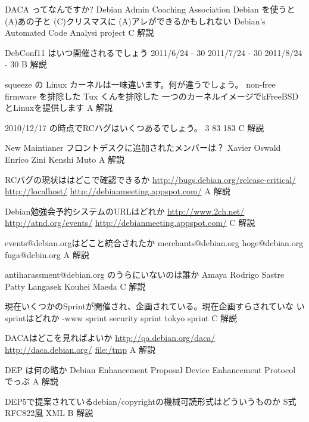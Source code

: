 %

\santaku
{DACA ってなんですか?}
{Debian Admin Coaching Association}
{Debian を使うと (A)あの子と (C)クリスマスに (A)アレができるかもしれない}
{Debian's Automated Code Analysi project}
{C}
{解説}

\santaku
{DebConf11 はいつ開催されるでしょう}
{2011/6/24 - 30}
{2011/7/24 - 30}
{2011/8/24 - 30}
{B}
{解説}

\santaku
{squeeze の Linux カーネルは一味違います。何が違うでしょう。}
{non-free firmware を排除した}
{Tux くんを排除した}
{一つのカーネルイメージでkFreeBSDとLinuxを提供します}
{A}
{解説}

\santaku
{2010/12/17 の時点でRCハグはいくつあるでしょう。}
{3} 
{83}
{183}
{C}
{解説}

\santaku
{New Maintianer フロントデスクに追加されたメンバーは？}
{Xavier Oswald}
{Enrico Zini}
{Kenshi Muto}
{A}
{解説}

\santaku
{RCバグの現状ははどこで確認できるか}
{\url{http://bugs.debian.org/release-critical/}}
{\url{http://localhost/}}
{\url{http://debianmeeting.appspot.com/}}
{A}
{解説}

\santaku
{Debian勉強会予約システムのURLはどれか}
{\url{http://www.2ch.net/}}
{\url{http://atnd.org/events/}}
{\url{http://debianmeeting.appspot.com/}}
{C}
{解説}

\santaku
{events@debian.orgはどこと統合されたか}
{merchants@debian.org}
{hoge@debian.org}
{fuga@debin.org}
{A}
{解説}

\santaku
{antiharassment@debian.org のうらにいないのは誰か}
{Amaya Rodrigo Sastre}
{Patty Langasek}
{Kouhei Maeda}
{C}
{解説}

\santaku
{現在いくつかのSprintが開催され、企画されている。現在企画すらされていな
いsprintはどれか}
{-www sprint}
{security sprint}
{tokyo sprint}
{C}
{解説}

\santaku
{DACAはどこを見ればよいか}
{\url{http://qa.debian.org/daca/}}
{\url{http://daca.debian.org/}}
{\url{file:/tmp}}
{A}
{解説}

\santaku
{DEP は何の略か}
{Debian Enhancement Proposal}
{Device Enhancement Protocol}
{でっぷ}
{A}
{解説}

\santaku
{DEP5で提案されているdebian/copyrightの機械可読形式はどういうものか}
{S式}
{RFC822風}
{XML}
{B}
{解説}

